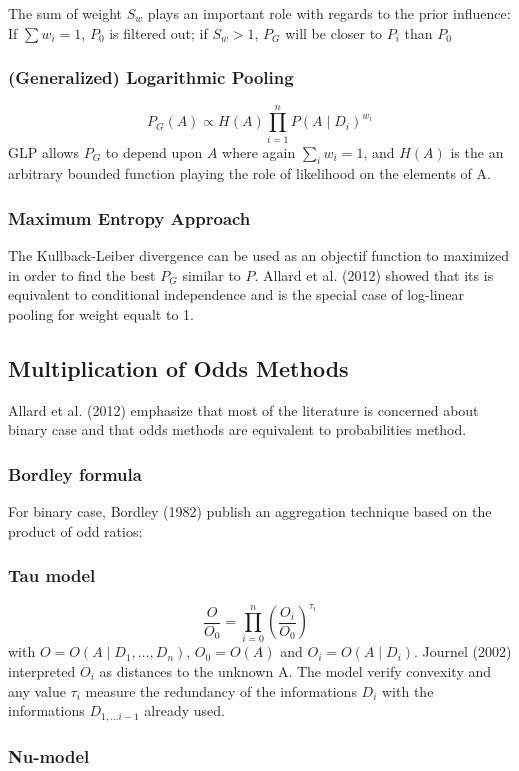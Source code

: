 \documentclass[twocolumn]{article}
\numberwithin{equation}{section}
\begin{document}
The sum of weight $S_w$ plays an important role with regards to the prior influence: If $\sum w_i=1$, $P_0$ is filtered out; if $S_w>1$, $P_G$ will be closer to $P_i$ than $P_0$


		\subsubsection{(Generalized) Logarithmic Pooling}
$$P_G(A) \propto H(A) \prod_{i=1}^n P(A \mid D_i)^{w_i}$$
GLP allows $P_G$ to depend upon $A$ where again $\sum_i w_i=1$, and $H(A)$ is the an arbitrary bounded function playing the role of likelihood on the elements of A.


		\subsubsection{Maximum Entropy Approach}
The Kullback-Leiber divergence can be used as an objectif function to maximized in order to find the best $P_G$ similar to $P$. Allard et al. (2012) showed that its is equivalent to conditional independence and is the special case of log-linear pooling for weight equalt to 1.




	\subsection{Multiplication of Odds Methods} 
Allard et al. (2012) emphasize that most of the literature is concerned about binary case and that odds methods are equivalent to probabilities method.
		\subsubsection{Bordley formula}
For binary case, Bordley (1982) publish an aggregation technique based on the product of odd ratios:


		\subsubsection{Tau model}
$$\frac{O}{O_0}=\prod_{i=0}^n \left( \frac{O_i}{O_0}\right)^{\tau_i}$$
with $O=O(A\mid D_1,\ldots,D_n)$, $O_0=O(A)$ and $O_i=O(A\mid D_i)$.
Journel (2002) interpreted $O_i$ as distances to the unknown A. The model verify convexity and any value $\tau_i$ measure the redundancy of the informations $D_i$ with the informations $D_{1,\ldots i-1}$ already used.

		\subsubsection{Nu-model}






	
	
\end{document}
